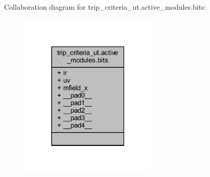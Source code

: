 Collaboration diagram for trip\+\_\+criteria\+\_\+ut.\+active\+\_\+modules.\+bits\+:
\nopagebreak
\begin{figure}[H]
\begin{center}
\leavevmode
\includegraphics[width=186pt]{dc/d98/a00225}
\end{center}
\end{figure}

